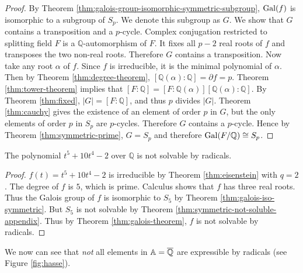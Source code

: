 \begin{proof}
	By Theorem \ref{thm:galois-group-isomorphic-symmetric-subgroup}, $\operatorname{Gal}(f)$ is isomorphic to a subgroup of $S_p$. We denote this subgroup as $G$. We show that $G$ contains a transposition and a $p$-cycle. Complex conjugation restricted to splitting field $F$ is a $\mathbb Q$-automorphism of $F$. It fixes all $p - 2$ real roots of $f$ and transposes the two non-real roots. Therefore $G$ contains a transposition. Now
	take any root $\alpha$ of $f$. Since $f$ is irreducible, it is the minimal polynomial of $\alpha$. Then by Theorem \ref{thm:degree-theorem}, $[\mathbb Q(\alpha) : \mathbb Q] = \partial f = p. $ Theorem \ref{thm:tower-theorem} implies that $[F : \mathbb Q] = [F : \mathbb Q(\alpha)] [ \mathbb Q(\alpha) : \mathbb Q]. $ By Theorem \ref{thm:fixed}, $|G| = [F : \mathbb Q]$, and thus $p$ divides $|G|$. Theorem \ref{thm:cauchy} gives the existence of an element of order $p$ in $G$, but the only elements of order $p$ in $S_p$ are $p$-cycles. Therefore $G$ contains a $p$-cycle. Hence by Theorem \ref{thm:symmetric-prime}, $ G = S_p$ and therefore $\operatorname{Gal}(F / \mathbb Q) \cong S_p$.
\end{proof}

\begin{example}
	The polynomial $t^5 + 10 t^4 - 2$ over $\mathbb Q$ is not solvable by radicals.
\end{example}

\begin{proof}
	$f(t) = t^5 + 10 t^4 - 2$ is irreducible by Theorem \ref{thm:eisenstein} with $q = 2$. The degree of $f$ is $5$, which is prime. Calculus shows that $f$ has three real roots. Thus the Galois group of $f$ is isomorphic to $S_5$ by Theorem \ref{thm:galois-iso-symmetric}. But $S_5$ is not solvable by Theorem \ref{thm:symmetric-not-soluble-appendix}. Thus by Theorem \ref{thm:galois-theorem}, $f$ is not solvable by radicals.
\end{proof}

We now can see that \textit{not} all elements in $\mathbb A = \overline {\mathbb Q}$ are expressible by radicals (see Figure \ref{fig:hasse}). 

